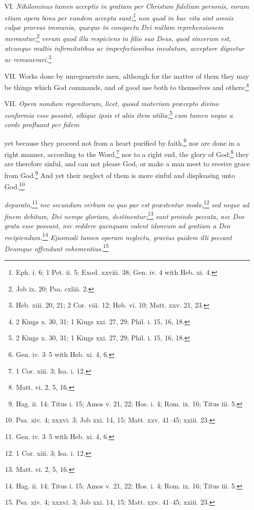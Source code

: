 VI. \emph{Nihilominus tamen acceptis in gratiam per Christum fidelium personis, eorum etiam opera bona per eundem accepta sunt;}\footnote{Eph. i. 6; 1 Pet. ii. 5; Exod. xxviii. 38; Gen. iv. 4 with Heb. xi. 4.}\emph{ non quod in hac vita sint omnis culpæ prorsus immunia, quæque in conspectu Dei nullam reprehensionem mereantur;}\footnote{Job ix. 20; Psa. cxliii. 2.}\emph{ verum quod illa respiciens in filio suo Deus, quod sincerum est, utcunque multis infirmitatibus ac imperfectionibus involutum, acceptare dignetur ac remunerari.}\footnote{Heb. xiii. 20, 21; 2 Cor. viii. 12; Heb. vi. 10; Matt. xxv. 21, 23.}

VII. Works done by unregenerate men, although for the matter of them they may be things which God commands, and of good use both to themselves and others;\footnote{2 Kings x. 30, 31; 1 Kings xxi. 27, 29; Phil. i. 15, 16, 18.}

VII. \emph{Opera nondum regenitorum, licet, quoad materiam præcepto divino conformia esse possint, sibique ipsis et aliis item utilia;}\footnote{2 Kings x. 30, 31; 1 Kings xxi. 27, 29; Phil. i. 15, 16, 18.}\emph{ cum tamen neque a corde profluant per fidem }

yet because they proceed not from a heart purified by faith,\footnote{Gen. iv. 3–5 with Heb. xi. 4, 6.} nor are done in a right manner, according to the Word,\footnote{1 Cor. xiii. 3; Isa. i. 12.} nor to a right end, the glory of God;\footnote{Matt. vi. 2, 5, 16.} they are therefore sinful, and can not please God, or make a man meet to receive grace from God.\footnote{Hag. ii. 14; Titus i. 15; Amos v. 21, 22; Hos. i. 4; Rom. ix. 16; Titus iii. 5.} And yet their neglect of them is more sinful and displeasing unto God.\footnote{Psa. xiv. 4; xxxvi. 3; Job xxi. 14, 15; Matt. xxv. 41–45; xxiii. 23.}

\emph{depurato,}\footnote{Gen. iv. 3–5 with Heb. xi. 4, 6.}\emph{ nec secundum verbum eo quo par est præstentur modo,}\footnote{1 Cor. xiii. 3; Isa. i. 12.}\emph{ sed neque ad finem debitum, Dei nempe gloriam, destinentur;}\footnote{Matt. vi. 2, 5, 16.}\emph{ sunt proinde peccata, nec Deo grata esse possunt, nec reddere quenquam valent idoneum ad gratiam a Deo recipiendum.}\footnote{Hag. ii. 14; Titus i. 15; Amos v. 21, 22; Hos. i. 4; Rom. ix. 16; Titus iii. 5.}\emph{ Ejusmodi tamen operum neglectu, gravius quidem illi peccant Deumque offendunt vehementius.}\footnote{Psa. xiv. 4; xxxvi. 3; Job xxi. 14, 15; Matt. xxv. 41–45; xxiii. 23.}


